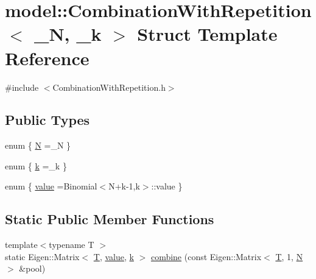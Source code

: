 \hypertarget{structmodel_1_1_combination_with_repetition}{}\section{model\+:\+:Combination\+With\+Repetition$<$ \+\_\+\+N, \+\_\+k $>$ Struct Template Reference}
\label{structmodel_1_1_combination_with_repetition}


{\ttfamily \#include $<$Combination\+With\+Repetition.\+h$>$}

\subsection*{Public Types}
\begin{DoxyCompactItemize}
\item 
enum \{ \hyperlink{structmodel_1_1_combination_with_repetition_a5aa11104ddc03bc31178591d5f907d63a4e5bdab5c740f9c3a381f08dd5c42dd2}{N} =\+\_\+\+N
 \}
\item 
enum \{ \hyperlink{structmodel_1_1_combination_with_repetition_a57e5423d393bfe4a16dfea78d8088588aea9858e06629d75314369096c8cd48bb}{k} =\+\_\+k
 \}
\item 
enum \{ \hyperlink{structmodel_1_1_combination_with_repetition_a66d1fbf7230e4ffd026698fc78f9d6c8a6fcdec545756da61f535c39cc215e575}{value} =Binomial$<$N+k-\/1,k$>$\+:\+:value
 \}
\end{DoxyCompactItemize}
\subsection*{Static Public Member Functions}
\begin{DoxyCompactItemize}
\item 
{\footnotesize template$<$typename T $>$ }\\static Eigen\+::\+Matrix$<$ \hyperlink{_spline_node_base__corder1_8h_a82692d3a5502b91460591f1d5504314a}{T}, \hyperlink{structmodel_1_1_combination_with_repetition_a66d1fbf7230e4ffd026698fc78f9d6c8a6fcdec545756da61f535c39cc215e575}{value}, \hyperlink{structmodel_1_1_combination_with_repetition_a57e5423d393bfe4a16dfea78d8088588aea9858e06629d75314369096c8cd48bb}{k} $>$ \hyperlink{structmodel_1_1_combination_with_repetition_a4b09bcd5af0648192dc877a8cd3398f9}{combine} (const Eigen\+::\+Matrix$<$ \hyperlink{_spline_node_base__corder1_8h_a82692d3a5502b91460591f1d5504314a}{T}, 1, \hyperlink{structmodel_1_1_combination_with_repetition_a5aa11104ddc03bc31178591d5f907d63a4e5bdab5c740f9c3a381f08dd5c42dd2}{N} $>$ \&pool)
\end{DoxyCompactItemize}


